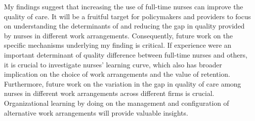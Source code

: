 \documentclass[final,12pt]{article}
\newcommand{\myreferences}{/Users/kimk13/Dropbox/Research/dissertn_bib}
\begin{document}
My findings suggest that increasing the use of full-time nurses can improve the quality of care. %
It will be a fruitful target for policymakers and providers to focus on understanding the determinants of and reducing the gap in quality provided by nurses in different work arrangements.
Consequently, future work on the specific mechanisms underlying my finding is critical. If experience were an important determinant of quality difference between full-time nurses and others, it is crucial to investigate nurses' learning curve, which also has broader implication on the choice of work arrangements and the value of retention.
Furthermore, future work on the variation in the gap in quality of care among nurses in different work arrangements across different firms is crucial. Organizational learning by doing on the management and configuration of alternative work arrangements will provide valuable insights.


\newpage

{}


\end{document}
